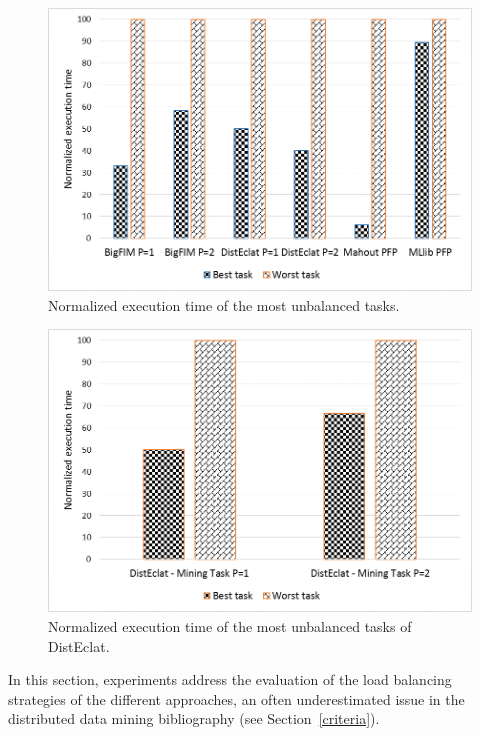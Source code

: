 \begin{figure}[!t]
\begin{center}
\includegraphics[width=5in]{chapters/survey/immagini/load_balance_big.png}
\caption{Normalized execution time of the most unbalanced tasks.}
\label{load_balance_big}
\end{center}
\end{figure}

\begin{figure}[!t]
\begin{center}
\includegraphics[width=5in]{chapters/survey/immagini/load_balance_disteclat.png}
\caption{Normalized execution time of the most unbalanced tasks of DistEclat.}
\label{load_balance_disteclat}
\end{center}
\end{figure}

In this section, experiments address the evaluation of the load balancing
strategies of the different approaches, an often underestimated issue
in the distributed data mining bibliography (see Section~\ref{criteria}).

